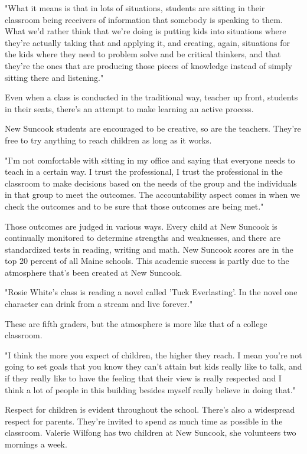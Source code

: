 "What it means is that in lots of situations, students are sitting in their classroom being receivers of information that somebody is speaking to them. What we'd rather think that we're doing is putting kids into situations where they're actually taking that and applying it, and creating, again, situations for the kids where they need to problem solve and be critical thinkers, and that they're the ones that are producing those pieces of knowledge instead of simply sitting there and listening."

Even when a class is conducted in the traditional way, teacher up front, students in their seats, there's an attempt to make learning an active process.

New Suncook students are encouraged to be creative, so are the teachers. They're free to try anything to reach children as long as it works.

"I'm not comfortable with sitting in my office and saying that everyone needs to teach in a certain way. I trust the professional, I trust the professional in the classroom to make decisions based on the needs of the group and the individuals in that group to meet the outcomes. The accountability aspect comes in when we check the outcomes and to be sure that those outcomes are being met."

Those outcomes are judged in various ways. Every child at New Suncook is continually monitored to determine strengths and weaknesses, and there are standardized tests in reading, writing and math. New Suncook scores are in the top 20 percent of all Maine schools. This academic success is partly due to the atmosphere that's been created at New Suncook.

"Rosie White's class is reading a novel called 'Tuck Everlasting'. In the novel one character can drink from a stream and live forever."

These are fifth graders, but the atmosphere is more like that of a college classroom.

"I think the more you expect of children, the higher they reach. I mean you're not going to set goals that you know they can't attain but kids really like to talk, and if they really like to have the feeling that their view is really respected and I think a lot of people in this building besides myself really believe in doing that."

Respect for children is evident throughout the school. There's also a widespread respect for parents. They're invited to spend as much time as possible in the classroom. Valerie Wilfong has two children at New Suncook, she volunteers two mornings a week.


